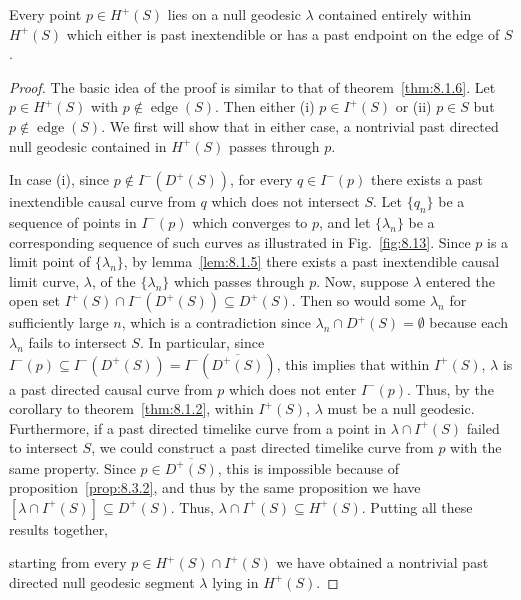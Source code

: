 \begin{theorem}\label{thm:8.3.5}
Every point \(p\in H^+(S)\) lies on a null geodesic \(\lambda\) contained entirely
within \(H^+(S)\) which either is past inextendible or has a past endpoint on the
edge of \(S\).
\end{theorem}
\begin{proof}
The basic idea of the proof is similar to that of theorem~\ref{thm:8.1.6}. Let
\(p\in H^+(S)\) with \(p\notin\operatorname{edge}(S)\). Then either
(i) \(p\in I^+(S)\) or (ii) \(p\in S\) but \(p\notin\operatorname{edge}(S)\). We
first will show that in either case, a nontrivial past directed null geodesic
contained in \(H^+(S)\) passes through \(p\).

In case (i), since \(p\notin I^-(D^+(S))\), for every \(q\in I^-(p)\) there exists
a past inextendible causal curve from \(q\) which does not intersect \(S\). Let
\(\{q_n\}\) be a sequence of points in \(I^-(p)\) which converges to \(p\), and let
\(\{\lambda_n\}\) be a corresponding sequence of such curves as illustrated in
Fig.~\ref{fig:8.13}. Since \(p\) is a limit point of \(\{\lambda_n\}\), by
lemma~\ref{lem:8.1.5} there exists a past inextendible causal limit curve,
\(\lambda\), of the \(\{\lambda_n\}\) which passes through \(p\). Now, suppose
\(\lambda\) entered the open set \(I^+(S)\cap I^-(D^+(S))\subseteq D^+(S)\).
Then so would some \(\lambda_n\) for sufficiently large \(n\), which is a
contradiction since \(\lambda_n\cap D^+(S)=\emptyset\) because each \(\lambda_n\)
fails to intersect \(S\). In particular, since
\(I^-(p)\subseteq I^-(D^+(S))=I^-(\overline{D^+(S)})\), this implies that within
\(I^+(S)\), \(\lambda\) is a past directed causal curve from \(p\) which does not
enter \(I^-(p)\). Thus, by the corollary to theorem~\ref{thm:8.1.2}, within
\(I^+(S)\), \(\lambda\) must be a null geodesic. Furthermore, if a past directed
timelike curve from a point in \(\lambda\cap I^+(S)\) failed to intersect \(S\), we
could construct a past directed timelike curve from \(p\) with the same property.
Since \(p\in\overline{D^+(S)}\), this is impossible because of
proposition~\ref{prop:8.3.2}, and thus by the same proposition we have
\([\lambda\cap I^+(S)]\subseteq D^+(S)\). Thus,
\(\lambda\cap I^+(S)\subseteq H^+(S)\). Putting all these results together,



starting from every \(p\in H^+(S)\cap I^+(S)\) we have obtained a nontrivial past
directed null geodesic segment \(\lambda\) lying in \(H^+(S)\).


\end{proof}
